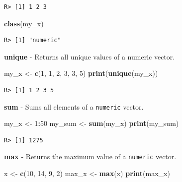 \documentclass[
  12pt,
]{book}
\newenvironment{Shaded}{\begin{snugshade}}{\end{snugshade}}
\newcommand{\DecValTok}[1]{\textcolor[rgb]{0.06,0.06,0.06}{#1}}
\newcommand{\KeywordTok}[1]{\textcolor[rgb]{0.27,0.27,0.27}{\textbf{#1}}}
\newcommand{\NormalTok}[1]{#1}
\newcommand{\OperatorTok}[1]{\textcolor[rgb]{0.43,0.43,0.43}{\textbf{#1}}}
\newcommand{\StringTok}[1]{\textcolor[rgb]{0.5,0.5,0.5}{#1}}
\begin{document}
\begin{verbatim}
R> [1] 1 2 3
\end{verbatim}

\begin{Shaded}
\begin{Highlighting}[]
\KeywordTok{class}\NormalTok{(my_x)}
\end{Highlighting}
\end{Shaded}

\begin{verbatim}
R> [1] "numeric"
\end{verbatim}

\textbf{unique} - Returns all unique values of a numeric vector. 

\begin{Shaded}
\begin{Highlighting}[]
\NormalTok{my_x <-}\StringTok{ }\KeywordTok{c}\NormalTok{(}\DecValTok{1}\NormalTok{, }\DecValTok{1}\NormalTok{, }\DecValTok{2}\NormalTok{, }\DecValTok{3}\NormalTok{, }\DecValTok{3}\NormalTok{, }\DecValTok{5}\NormalTok{)}
\KeywordTok{print}\NormalTok{(}\KeywordTok{unique}\NormalTok{(my_x))}
\end{Highlighting}
\end{Shaded}

\begin{verbatim}
R> [1] 1 2 3 5
\end{verbatim}

\textbf{sum} - Sums all elements of a \texttt{numeric} vector. 

\begin{Shaded}
\begin{Highlighting}[]
\NormalTok{my_x <-}\StringTok{ }\DecValTok{1}\OperatorTok{:}\DecValTok{50}
\NormalTok{my_sum <-}\StringTok{ }\KeywordTok{sum}\NormalTok{(my_x)}
\KeywordTok{print}\NormalTok{(my_sum)}
\end{Highlighting}
\end{Shaded}

\begin{verbatim}
R> [1] 1275
\end{verbatim}

\textbf{max} - Returns the maximum value of a \texttt{numeric} vector. 

\begin{Shaded}
\begin{Highlighting}[]
\NormalTok{x <-}\StringTok{ }\KeywordTok{c}\NormalTok{(}\DecValTok{10}\NormalTok{, }\DecValTok{14}\NormalTok{, }\DecValTok{9}\NormalTok{, }\DecValTok{2}\NormalTok{)}
\NormalTok{max_x <-}\StringTok{ }\KeywordTok{max}\NormalTok{(x)}
\KeywordTok{print}\NormalTok{(max_x)}
\end{Highlighting}
\end{Shaded}
\end{document}
